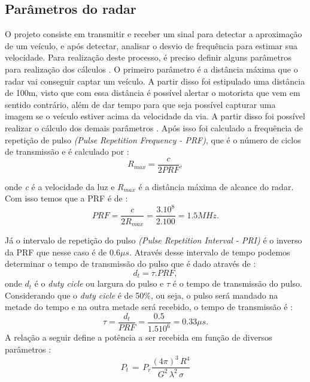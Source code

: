\subsection{Parâmetros do radar}
O projeto consiste em transmitir e receber um sinal para detectar a aproximação de um veículo, e após detectar, analisar o desvio de frequência para estimar sua velocidade. Para realização deste processo, é preciso definir alguns parâmetros para realização dos cálculos \cite{richards}.
O primeiro parâmetro é a distância máxima que o radar vai conseguir captar um veículo. A partir disso foi estipulado uma distância de 100m, visto que com essa distância é possível alertar o motorista que vem em sentido contrário, além de dar tempo para que seja possível capturar uma imagem se o veículo estiver acima da velocidade da via. A partir disso foi possível realizar o cálculo dos demais parâmetros \cite{louis}.
Após isso foi calculado a frequência de repetição de pulso \emph{ (Pulse Repetition Frequency - PRF)}, que é o número de ciclos de transmissão e é calculado por \cite{richards}:
\begin{equation}\label{R_MAX}
    R_{max} =  \frac{c}{2PRF},
\end{equation}

onde \emph{c} é a velocidade da luz e $R_{max}$ é a distância máxima de alcance do radar. Com isso temos que a PRF é de  \cite{richards}:
\begin{equation}\label{PRF}
  PRF =  \frac{c}{2R_{max}} = \frac{3.10^8}{2.100} = 1.5MHz.
\end{equation} \par
Já o intervalo de repetição do pulso \emph{(Pulse Repetition Interval - PRI)} é o inverso da PRF que nesse caso é de $0.6\mu s$. Através desse intervalo de tempo podemos determinar o tempo de transmissão do pulso que é dado através de  \cite{richards}: 
\begin{equation}\label{duty}
  d_t = \tau . PRF,
\end{equation}
onde $d_t$ é o \emph{duty cicle} ou largura do pulso e $\tau$ é o tempo de transmissão do pulso. Considerando que o \emph{duty cicle} é de 50$\%$, ou seja, o pulso será mandado na metade do tempo e na outra metade será recebido, o tempo de transmissão é  \cite{richards}:
\begin{equation}\label{tal}
  \tau = \frac{d_t}{PRF} =  \frac{0.5}{1.510^6} = 0.33\mu s.
\end{equation}
A relação a seguir define a potência a ser recebida em função de diversos parâmetros  \cite{richards}:
\begin{equation}\label{potencia_recebida}
    P_t\, =\,   P_r \frac{(4\pi)^{3}\,  R^{4}}{G^{2}\,   \lambda^{2}\, \sigma }  
\end{equation}%

